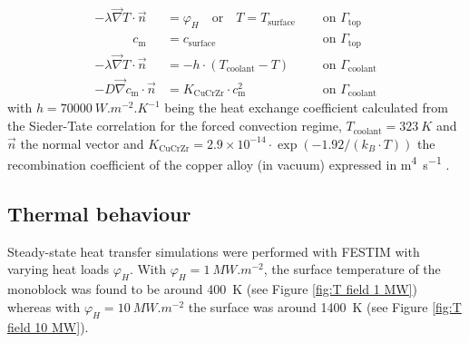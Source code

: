 \begin{eqnarray}
    -\lambda \vec{\nabla} T \cdot \vec{n} &=\varphi_{H} \quad \text{or} \quad T = T_\mathrm{surface}\quad &\text { on } \Gamma_\mathrm{top}\\
    \qquad \quad c_\mathrm{m} &=  c_\mathrm{surface}\quad &\text { on } \Gamma_\mathrm{top}\\
    -\lambda \vec{\nabla} T\cdot \vec{n} &= -h \cdot \left(T_\mathrm{coolant} - T\right)\quad &\text { on } \Gamma_\mathrm{coolant}\\
    -D \vec{\nabla} c_\mathrm{m} \cdot \vec{n} &= K_\mathrm{CuCrZr} \cdot c_\mathrm{m}^{2} \quad &\text { on } \Gamma_\mathrm{coolant}
\end{eqnarray}
with $h=\SI{70000}{W.m^{-2}.K^{-1}}$ being the heat exchange coefficient calculated from the Sieder-Tate correlation for the forced convection regime, $T_\mathrm{coolant}= \SI{323}{K}$ and $\vec{n}$ the normal vector and $K_\mathrm{CuCrZr} = 2.9 \times 10^{-14}\cdot \exp{(-1.92/(k_B\cdot T))}$ the recombination coefficient of the copper alloy (in vacuum) expressed in \si{m^4.s^{-1}} .


\subsection{Thermal behaviour}
Steady-state heat transfer simulations were performed with FESTIM with varying heat loads $\varphi_H$.
With $\varphi_H = \SI{1}{MW.m^{-2}}$, the surface temperature of the monoblock was found to be around \SI{400}{K} (see Figure \ref{fig:T field 1 MW}) whereas with $\varphi_H = \SI{10}{MW.m^{-2}}$ the surface was around \SI{1400}{K} (see Figure \ref{fig:T field 10 MW}).

